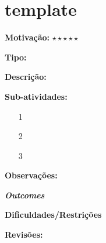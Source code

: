 \chapter{template}

\textbf{Motivação:} $\star\star\star\star\star$

\textbf{Tipo:}

\textbf{Descrição:}

\textbf{Sub-atividades:}

\begin{itemize}
	\item[1]
	\item[2]
	\item[3]
\end{itemize}

\textbf{Observações:}

\textbf{\textit{Outcomes}}

\textbf{Dificuldades/Restrições}

\textbf{Revisões:}
\date{\today}
